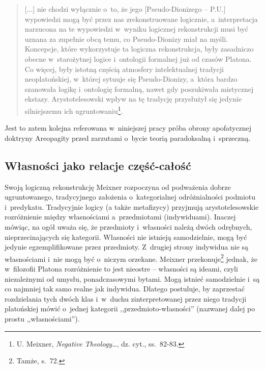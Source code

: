 \begin{quote}
[...] nie chodzi wyłącznie o~to, że jego [Pseudo-Dionizego -- P.U.] wypowiedzi mogą być przez nas zrekonstruowane logicznie, a~interpretacja narzucona na te wypowiedzi w~wyniku logicznej rekonstrukcji musi być uznana za zupełnie obcą temu, co Pseudo-Dionizy miał na myśli. Koncepcje, które wykorzystuje ta logiczna rekonstrukcja, były zasadniczo obecne w~starożytnej logice i~ontologii formalnej już od czasów Platona. Co więcej, były istotną częścią atmosfery intelektualnej tradycji neoplatońskiej, w~której sytuuje się Pseudo-Dionizy, a~która bardzo szanowała logikę i~ontologię formalną, nawet gdy poszukiwała mistycznej ekstazy. Arystotelesowski wpływ na tę tradycję przysłużył się jedynie silniejszemu ich ugruntowaniu\footnote{U. Meixner, \textit{Negative Theology}\ldots, dz. cyt., ss.~82-83.}.
\end{quote}
Jest to zatem kolejna referowana w~niniejszej pracy próba obrony apofatycznej doktryny Areopagity przed zarzutami o~bycie teorią paradoksalną i~sprzeczną.

\subsection{Własności jako relacje część-całość}

Swoją logiczną rekonstrukcję Meixner rozpoczyna od podważenia dobrze ugruntowanego, tradycyjnego założenia o~kategorialnej odróżnialności podmiotu i~predykatu. Tradycyjnie logicy (a także metafizycy) przyjmują arystotelesowskie rozróżnienie między własnościami a~przedmiotami (indywiduami). Inaczej mówiąc, na ogół uważa się, że przedmioty i~własności należą dwóch odrębnych, nieprzecinających się kategorii. Własności nie istnieją samodzielnie, mogą być jedynie egzemplifikowane przez przedmioty. Z~drugiej strony indywidua nie są własnościami i~nie mogą być o~niczym orzekane. Meixner przekonuje\footnote{Tamże, s.~72.} jednak, że w~filozofii Platona rozróżnienie to jest nieostre -- własności są ideami, czyli niezależnymi od umysłu, ponadczasowymi bytami. Mogą istnieć samodzielnie i~są co najmniej tak samo realne jak indywidua. Dlatego postuluje, by zaprzestać rozdzielania tych dwóch klas i~w~duchu zinterpretowanej przez niego tradycji platońskiej mówić o~jednej kategorii ,,przedmioto-własności'' (nazwanej dalej po prostu ,,własnościami'').

